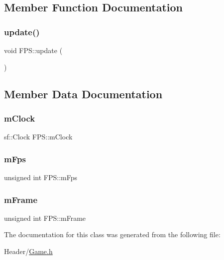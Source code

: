 \subsection{Member Function Documentation}
\mbox{\label{class_f_p_s_a230d52d9a0b736e73d43100f6441a4bf}} 
\subsubsection{\texorpdfstring{update()}{update()}}
{\footnotesize\ttfamily void F\+P\+S\+::update (\begin{DoxyParamCaption}{ }\end{DoxyParamCaption})\hspace{0.3cm}{\ttfamily [inline]}}



\subsection{Member Data Documentation}
\mbox{\label{class_f_p_s_af28828c6a721936d2daf31540883c5fd}} 
\subsubsection{\texorpdfstring{mClock}{mClock}}
{\footnotesize\ttfamily sf\+::\+Clock F\+P\+S\+::m\+Clock}

\mbox{\label{class_f_p_s_a1bcf269a7357d4f100abf5eee36e22d2}} 
\subsubsection{\texorpdfstring{mFps}{mFps}}
{\footnotesize\ttfamily unsigned int F\+P\+S\+::m\+Fps}

\mbox{\label{class_f_p_s_aad714ffd7940021e52d054f2335986a2}} 
\subsubsection{\texorpdfstring{mFrame}{mFrame}}
{\footnotesize\ttfamily unsigned int F\+P\+S\+::m\+Frame}



The documentation for this class was generated from the following file\+:\begin{DoxyCompactItemize}
\item 
Header/\mbox{\hyperlink{_game_8h}{Game.\+h}}\end{DoxyCompactItemize}
